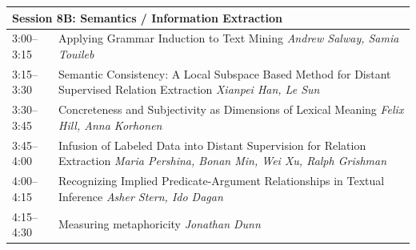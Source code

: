 \documentclass{book}
\renewcommand{\large}{\fontsize{36}{40}\selectfont}
\begin{document}
\begin{tabular}{p{3in}p{16in}}
  \multicolumn{2}{l}{\bfseries\large Session 8B: Semantics / Information Extraction} \\\hline

    
    3:00--3:15
    &	Applying Grammar Induction to Text Mining \newline 
    {\itshape Andrew Salway, Samia Touileb} \\
    
    3:15--3:30
    &	Semantic Consistency: A Local Subspace Based Method for Distant Supervised Relation Extraction \newline 
    {\itshape Xianpei Han, Le Sun} \\
    
    3:30--3:45
    &	Concreteness and Subjectivity as Dimensions of Lexical Meaning \newline 
    {\itshape Felix Hill, Anna Korhonen} \\
    
    3:45--4:00
    &	Infusion of Labeled Data into Distant Supervision for Relation Extraction \newline 
    {\itshape Maria Pershina, Bonan Min, Wei Xu, Ralph Grishman} \\
    
    4:00--4:15
    &	Recognizing Implied Predicate-Argument Relationships in Textual Inference \newline 
    {\itshape Asher Stern, Ido Dagan} \\
    
    4:15--4:30
    &	Measuring metaphoricity \newline 
    {\itshape Jonathan Dunn} \\
    
\end{tabular}
\end{document}

